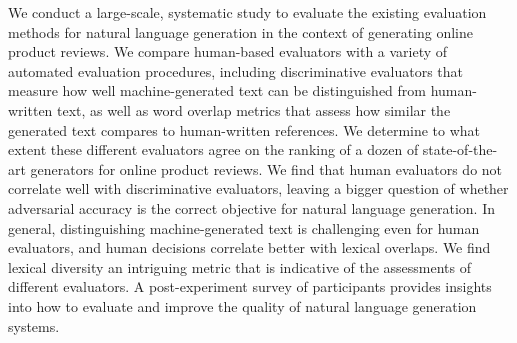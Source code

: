 We conduct a large-scale, systematic study to evaluate the existing evaluation methods
for natural language generation in the context of generating online product reviews. We
compare human-based evaluators with a variety of automated evaluation procedures, including discriminative evaluators that measure how well machine-generated text can be distinguished from human-written text, as well as word overlap metrics that assess how similar the generated text compares to human-written references. We determine to what extent these different evaluators agree on the ranking of a dozen of state-of-the-art generators for online product reviews. We find that human evaluators do not correlate well with discriminative evaluators, leaving a bigger question of whether adversarial accuracy is the correct objective for natural language generation. In general, distinguishing machine-generated text is challenging even for human evaluators, and
human decisions correlate better with lexical overlaps. We find lexical diversity an intriguing metric that is indicative of the assessments of different evaluators. A post-experiment survey of participants provides insights into how to evaluate and improve the quality of natural language generation systems.